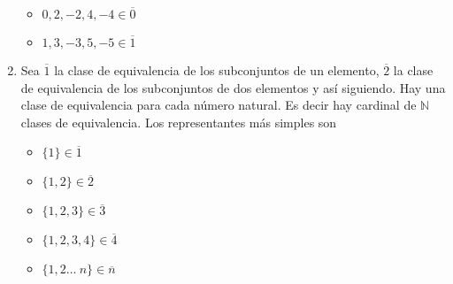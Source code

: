 \begin{enumerate}
\begin{multicols}{2}
  \begin{itemize}
  \item $0,2,-2,4,-4 \in \overline{0}$
  \item $1,3,-3,5,-5 \in \overline{1}$
  \end{itemize}
  \end{multicols}
\item %
  Sea $\overline{1}$ la clase de equivalencia de los subconjuntos de un elemento, $\overline{2}$ la clase de equivalencia de los subconjuntos de dos elementos y así siguiendo. Hay una clase de equivalencia para cada número natural. Es decir hay cardinal de $\mathbb{N}$ clases de equivalencia. Los representantes más simples son
  \begin{multicols}{3}
  \begin{itemize}
  \item $\{1\} \in \overline{1}$
  \item $\{1,2\} \in \overline{2}$
  \item $\{1,2,3\} \in \overline{3}$
  \item $\{1,2,3,4\} \in \overline{4}$
  \item $\{1,2 \ldots\ n\} \in \overline{n}$
  \end{itemize}
  \end{multicols} 
\end{enumerate}